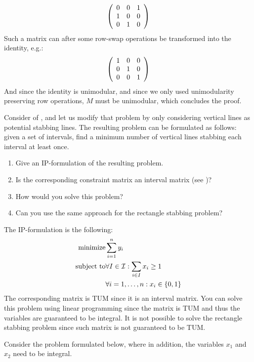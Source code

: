 {\begin{exercise}
\begin{answer}
\begin{equation}
\label{unimodular_interval_2}
\left( \begin{array}{ccc}
0&0&1\\
1&0&0\\
0&1&0
\end{array} \right)
\end{equation}
Such a matrix can after some row-swap operations be transformed into the identity, e.g.:
\begin{equation}
\left( \begin{array}{ccc}
1&0&0\\
0&1&0\\
0&0&1
\end{array} \right)
\end{equation}
And since the identity is unimodular, and since we only used unimodularity preserving row operations, $M$ must be unimodular, which concludes the proof.
\end{answer}
\end{exercise}
\begin{exercise}
Consider  of , and let us modify that problem by only considering vertical lines as
potential stabbing lines. The resulting problem can be formulated as follows: given a set of intervals,
find a minimum number of vertical lines stabbing each interval at least once.
\begin{enumerate}
 \item Give an IP-formulation of the resulting problem.
 \item Is the corresponding constraint matrix an interval matrix (see )?
 \item How would you solve this problem?
 \item Can you use the same approach for the rectangle stabbing problem?
\end{enumerate}
\end{exercise}
\begin{answer}
The IP-formulation is the following:
\begin{eqnarray}
\mbox{minimize}&\sumieqb[i]{1}{n}{y_i}\eqnlab{rsv-m}\\
\mbox{subject to}&\forall I\in\calI:\sumdomain[i]{I}{x_{i}}\geq 1\eqnlab{rsv-c1}\\
&\forall\rangei[i]{1}{n}:x_i\in\accl{0,1}\eqnlab{rsv-c2}
\end{eqnarray}
The corresponding matrix is TUM since it is an interval matrix. You can solve this problem using linear programming since the matrix is TUM and thus the variables are guaranteed to be integral. It is not possible to solve the rectangle stabbing problem since such matrix is not guaranteed to be TUM.
\end{answer}
\begin{exercise}
Consider the problem formulated below, where in addition, the variables $x_1$ and $x_2$ need to be integral.


\end{exercise}}
